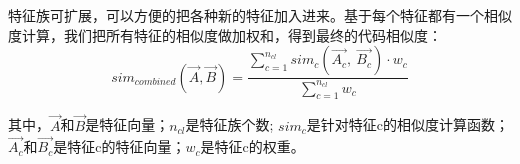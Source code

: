 特征族可扩展，可以方便的把各种新的特征加入进来。基于每个特征都有一个相似度计算，我们把所有特征的相似度做加权和，得到最终的代码相似度：
\begin{equation}
	sim_{combined}(\vec{A},\vec{B})=\frac{\sum_{c=1}^{n_{cl}}sim_{c}(\vec{A_c},~\vec{B_c})\cdot w_{c}}{\sum_{c=1}^{n_{cl}}w_{c}}
\end{equation}

其中，$\vec{A}$和$\vec{B}$是特征向量；$n_{cl}$是特征族个数; $sim_{c}$是针对特征c的相似度计算函数；$\vec{A_c}$和$\vec{B_c}$是特征c的特征向量；$w_{c}$是特征c的权重。